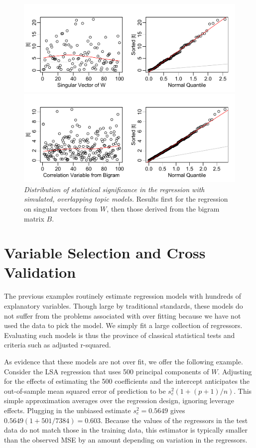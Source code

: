 \documentclass[12pt]{article}
\begin{document}
 
 \begin{figure}
 \caption{ \label{fig:simregr}
  {\sl Distribution of statistical significance in the regression with simulated, overlapping topic models.} Results first for the regression on singular vectors from $W$, then those derived from the bigram matrix $B$.}
   \centerline{ \includegraphics[width=5in]{figures/simregrW}  }
   \centerline{ \includegraphics[width=5in]{figures/simregrB}  }
 \end{figure}

\section{Variable Selection and Cross Validation}
\label{sec:cv}

The previous examples routinely estimate regression models with hundreds of explanatory variables.  Though large by traditional standards, these models do not suffer from the problems associated with over fitting because we have not used the data to pick the model.  We simply fit a large collection of regressors.  Evaluating such models is thus the province of classical statistical tests and criteria such as adjusted r-squared.  

As evidence that these models are not over fit, we offer the following example.  Consider the LSA regression that uses 500 principal components of $W$.  Adjusting for the effects of estimating the 500 coefficients and the intercept anticipates the out-of-sample mean squared error of prediction to be $s_e^2 (1+(p+1)/n)$.  This simple approximation averages over the regression design, ignoring leverage effects.  Plugging in the unbiased estimate $s_e^2 = 0.5649$ gives $0.5649 (1+501/7384) = 0.603$.  Because the values of the regressors in the test data do not match those in the training data, this estimator is typically smaller than the observed MSE by an amount depending on variation in the regressors.  
\end{document}
